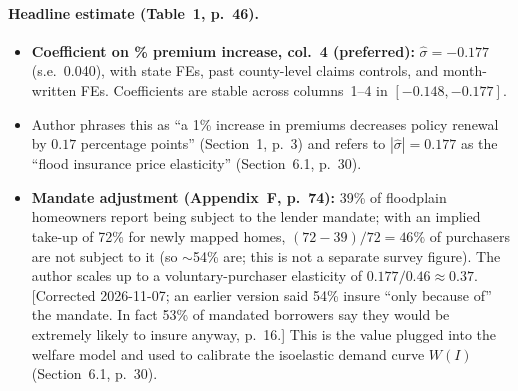 \documentclass[11pt]{article}
\begin{document}
\paragraph{Headline estimate (Table~1, p.~46).}
\begin{itemize}
\item \textbf{Coefficient on \% premium increase, col.~4 (preferred):}
$\hat\sigma = -0.177$ (s.e.\ 0.040), with state FEs, past county-level
claims controls, and month-written FEs. Coefficients are stable across
columns~1--4 in $[-0.148, -0.177]$.
\item Author phrases this as ``a 1\% increase in premiums decreases policy
renewal by $0.17$ percentage points'' (Section~1, p.~3) and refers to
$|\hat\sigma|=0.177$ as the ``flood insurance price elasticity'' (Section~6.1,
p.~30).
\item \textbf{Mandate adjustment (Appendix~F, p.~74):} 39\% of floodplain
homeowners report being subject to the lender mandate; with an implied
take-up of 72\% for newly mapped homes, $(72-39)/72 = 46\%$ of purchasers
are not subject to it (so $\sim$54\% are; this is not a separate survey
figure). The author scales up to a voluntary-purchaser elasticity of
$0.177/0.46 \approx 0.37$. [Corrected 2026-11-07; an earlier version said
54\% insure ``only because of'' the mandate. In fact 53\% of mandated
borrowers say they would be extremely likely to insure anyway, p.~16.] This is the value plugged into
the welfare model and used to calibrate the isoelastic demand curve $W(I)$
(Section~6.1, p.~30).
\end{itemize}
\end{document}
